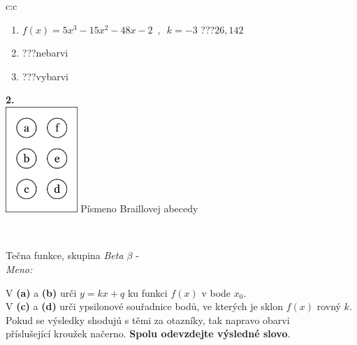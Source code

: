 \documentclass[10pt]{report}
\begin{document}
\begin{tabular}{c:c}
\begin{minipage}[c][104.5mm][t]{0.5\linewidth}
\begin{center}
\begin{minipage}{0.79\linewidth}
\begin{center}
\begin{varwidth}{\linewidth}
\begin{enumerate}
\item $f(x)=5x^3-15x^2-48x-2\enspace , \enspace k=-3$\quad \dotfill\; ???\;\dotfill \quad $26 , 142$
\item \quad \dotfill\; ???\;\dotfill \quad nebarvi
\item \quad \dotfill\; ???\;\dotfill \quad vybarvi
\end{enumerate}
\end{varwidth}
\end{center}
\end{minipage}
\begin{minipage}{0.20\linewidth}
\begin{center}
{\Huge\bfseries 2.} \\[2mm]
\includegraphics[height=40mm]{../images/braille.png}
{\small Písmeno Braillovej abecedy}
\end{center}
\end{minipage}
\end{center}
\end{minipage}
\\ \hdashline
\begin{minipage}[c][104.5mm][t]{0.5\linewidth}
\begin{center}
\vspace{7mm}
{\huge Tečna funkce, skupina \textit{Beta $\beta$} -}\\[5mm]
\textit{Meno:}\phantom{xxxxxxxxxxxxxxxxxxxxxxxxxxxxxxxxxxxxxxxxxxxxxxxxxxxxxxxxxxxxxxxxx}\\[5mm]
\begin{minipage}{0.95\linewidth}
\begin{center}
V \textbf{(a)} a \textbf{(b)} urči  $y = kx + q$ ku funkci $f(x)$ v bode $x_0$.\\V \textbf{(c)} a \textbf{(d)} urči ypsilonové souřadnice bodů, ve kterých je sklon $f(x)$ rovný $k$.\\Pokud se výsledky shodujú s těmi za otazníky, tak napravo obarvi\\příslušející kroužek načerno. \textbf{Spolu odevzdejte výsledné slovo}.
\end{center}

\end{minipage}
\end{center}
\end{minipage}
\end{tabular}
\end{document}
